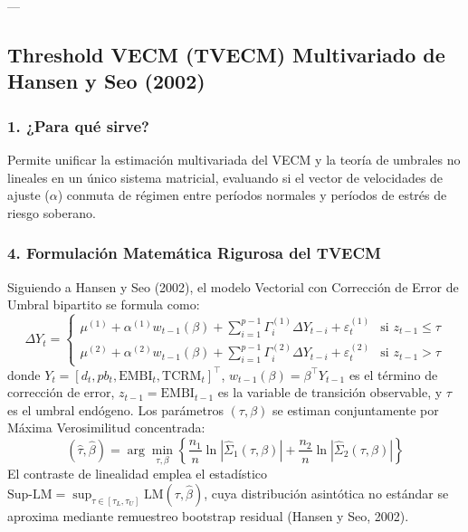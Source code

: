 \documentclass[11pt,a4paper]{article}
\begin{document}
---

\subsection{Threshold VECM (TVECM) Multivariado de Hansen y Seo (2002)}

\subsubsection{1. ¿Para qué sirve?}
Permite unificar la estimación multivariada del VECM y la teoría de umbrales no lineales en un único sistema matricial, evaluando si el vector de velocidades de ajuste ($\alpha$) conmuta de régimen entre períodos normales y períodos de estrés de riesgo soberano.

\subsubsection{4. Formulación Matemática Rigurosa del TVECM}
Siguiendo a Hansen y Seo (2002), el modelo Vectorial con Corrección de Error de Umbral bipartito se formula como:
\begin{equation}
\Delta Y_t = \begin{cases} 
\mu^{(1)} + \alpha^{(1)} w_{t-1}(\beta) + \sum_{i=1}^{p-1} \Gamma_i^{(1)} \Delta Y_{t-i} + \varepsilon_t^{(1)} & \text{si } z_{t-1} \le \tau \\
\mu^{(2)} + \alpha^{(2)} w_{t-1}(\beta) + \sum_{i=1}^{p-1} \Gamma_i^{(2)} \Delta Y_{t-i} + \varepsilon_t^{(2)} & \text{si } z_{t-1} > \tau 
\end{cases}
\end{equation}
donde $Y_t = [d_t, pb_t, \text{EMBI}_t, \text{TCRM}_t]^\top$, $w_{t-1}(\beta) = \beta^\top Y_{t-1}$ es el término de corrección de error, $z_{t-1} = \text{EMBI}_{t-1}$ es la variable de transición observable, y $\tau$ es el umbral endógeno. Los parámetros $(\tau, \beta)$ se estiman conjuntamente por Máxima Verosimilitud concentrada:
\begin{equation}
(\hat{\tau}, \hat{\beta}) = \arg\min_{\tau, \beta} \left\{ \frac{n_1}{n} \ln |\hat{\Sigma}_1(\tau, \beta)| + \frac{n_2}{n} \ln |\hat{\Sigma}_2(\tau, \beta)| \right\}
\end{equation}
El contraste de linealidad emplea el estadístico $\text{Sup-LM} = \sup_{\tau \in [\tau_L, \tau_U]} \text{LM}(\tau, \hat{\beta})$, cuya distribución asintótica no estándar se aproxima mediante remuestreo bootstrap residual (Hansen y Seo, 2002).
\end{document}
